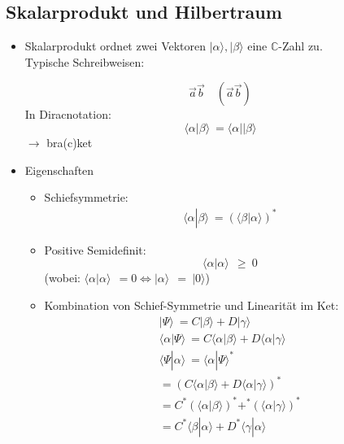 \documentclass[10pt,article,colorback,accentcolor=tud9d]{scrartcl}
\begin{document}
\subsection{Skalarprodukt und Hilbertraum}
\begin{itemize}
\item Skalarprodukt ordnet zwei Vektoren $\left|\alpha\rangle \right.,\left|\beta\rangle 
\right.$ eine $\mathbb{C}$-Zahl zu.\\
Typische Schreibweisen:
 
\begin{equation}
\vec{a}\vec{b} \quad (\vec{a}\vec{b})
\end{equation}
In Diracnotation:
\begin{equation}
\langle \alpha\left|\right.\beta\rangle  \ =\langle \alpha \left|\right|\beta\rangle 
\end{equation}
$\rightarrow$ bra(c)ket
\item Eigenschaften
\begin{itemize}
\item Schiefsymmetrie:
\begin{equation}
\begin{aligned}
\langle \alpha\left|\right.\beta\rangle  \ =(\langle \beta\left|\right.\alpha\rangle )^*
\end{aligned}
\end{equation}
\item Positive Semidefinit: 
\begin{equation}
\langle \alpha\left|\right.\alpha\rangle  \ \ \geq \ 0
\end{equation}
(wobei: $\langle \alpha\left|\right.\alpha\rangle  \ \ = 0 \Leftrightarrow \left|
\alpha\right.\rangle  \ \ = \ \left|0\right.\rangle $)
\item Kombination von Schief-Symmetrie und Linearität im Ket:
\begin{equation}
\begin{aligned}
\left|\right.\Psi\rangle  \ = C\left|\right.\beta\rangle +D\left|\right.\gamma\rangle \\
\langle \alpha\left|\right.\Psi\rangle  \ =C\langle \alpha\left|\right.\beta\rangle  +D\langle \alpha\left|\right
.\gamma\rangle \\
\langle \Psi\left|\right.\alpha\rangle  \ =\langle \alpha\left|\right.\Psi\rangle ^* \\
 =(C \langle \alpha\left|\right.\beta\rangle  + D\langle \alpha\left|\right.\gamma\rangle )^*\\
=C^*(\langle \alpha\left|\right.\beta\rangle )^* + ^*(\langle \alpha\left|\right.\gamma\rangle )^*\\
=C^*\langle \beta\left|\right.\alpha\rangle  +D^*\langle \gamma\left|\right.\alpha\rangle 
\end{aligned}
\end{equation}
\end{itemize}
 

\end{itemize}
\end{document}

